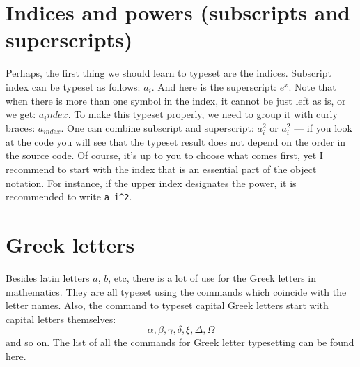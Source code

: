 \section{Indices and powers (subscripts and superscripts)}
\par Perhaps, the first thing we should learn to typeset are the indices.
Subscript index can be typeset as follows: \(a_i\).
And here is the superscript: \(e^x\).
Note that when there is more than one symbol in the index, it cannot be just left as is, or we get: $a_index$. To make this typeset properly, we need to group it with curly braces: $a_{index}$.
One can combine subscript and superscript: $a_i^2$ or $a^2_i$ --- if you look at the code you will see that the typeset result does not depend on the order in the source code. Of course, it’s up to you to choose what comes first, yet I recommend to start with the index that is an essential part of the object notation. For instance, if the upper index designates the power, it is recommended to write \verb"a_i^2".

\section{Greek letters}
\par Besides latin letters $a$, $b$, etc, there is a lot of use for the Greek letters in mathematics. They are all typeset using the commands which coincide with the letter names. Also, the command to typeset capital Greek letters start with capital letters themselves:
\[\alpha, \beta, \gamma, \delta, \xi, \Delta, \Omega\]
and so on. The list of all the commands for Greek letter typesetting can be found \href{https://www.latex-tutorial.com/symbols/greek-alphabet/}{here}.

